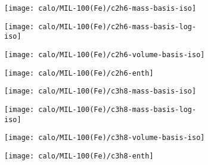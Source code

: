 \begin{figure}[H]

    \begin{subfigure}{0.25\textwidth}
        \texttt{[image: calo/MIL-100(Fe)/c2h6-mass-basis-iso]}%
        \label{appx:fig:shaping:mil100c2h6mass}
    \end{subfigure}%
    \begin{subfigure}{0.25\textwidth}
        \texttt{[image: calo/MIL-100(Fe)/c2h6-mass-basis-log-iso]}%
        \label{appx:fig:shaping:mil100c2h6masslog}
    \end{subfigure}%
    \begin{subfigure}{0.25\textwidth}
        \texttt{[image: calo/MIL-100(Fe)/c2h6-volume-basis-iso]}%
        \label{appx:fig:shaping:mil100c2h6volume}
    \end{subfigure}%
    \begin{subfigure}{0.25\textwidth}
        \texttt{[image: calo/MIL-100(Fe)/c2h6-enth]}%
        \label{appx:fig:shaping:mil100c2h6enth}
    \end{subfigure}%

    \begin{subfigure}{0.25\textwidth}
        \texttt{[image: calo/MIL-100(Fe)/c3h8-mass-basis-iso]}%
        \label{appx:fig:shaping:mil100c3h8mass}
    \end{subfigure}%
    \begin{subfigure}{0.25\textwidth}
        \texttt{[image: calo/MIL-100(Fe)/c3h8-mass-basis-log-iso]}%
        \label{appx:fig:shaping:mil100c3h8masslog}
    \end{subfigure}%
    \begin{subfigure}{0.25\textwidth}
        \texttt{[image: calo/MIL-100(Fe)/c3h8-volume-basis-iso]}%
        \label{appx:fig:shaping:mil100c3h8volume}
    \end{subfigure}%
    \begin{subfigure}{0.25\textwidth}
        \texttt{[image: calo/MIL-100(Fe)/c3h8-enth]}%
        \label{appx:fig:shaping:mil100c3h8enth}
    \end{subfigure}%


\end{figure}
